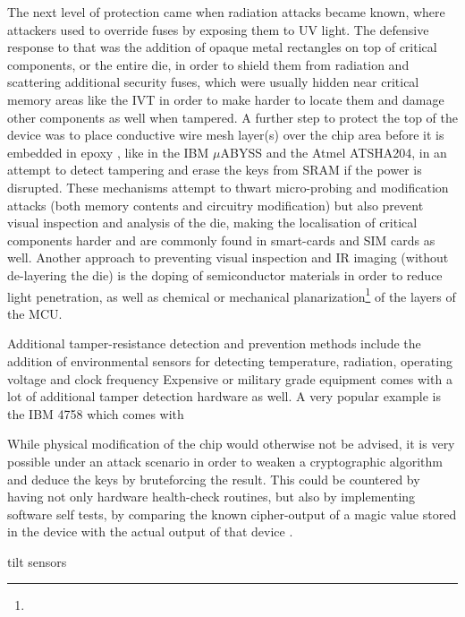 The next level of protection came when radiation attacks became known\citep{sergei:thesis}, where attackers used to override fuses by exposing them to UV light. The defensive response to that was the addition of opaque metal rectangles on top of critical components, or the entire die, in order to shield them from radiation and scattering additional security fuses, which were usually hidden near critical memory areas like the IVT in order to make harder to locate them and damage other components as well when tampered\citep{sergei:thesis}\citep{hwre}. A further step to protect the top of the device was to place conductive wire mesh layer(s) over the chip area before it is embedded in epoxy , like in the IBM $\mu$ABYSS \citep{website:ibm_secure} and the Atmel ATSHA204\citep{hwre}, in an attempt to detect tampering and erase the keys from SRAM if the power is disrupted. These mechanisms attempt to thwart micro-probing and modification attacks (both memory contents and circuitry modification)  but also prevent visual inspection and analysis of the die\citep{hwre}, making the localisation of critical components harder and are commonly found in smart-cards\citep{sergei:thesis} and SIM cards as well\citep{hwre}. Another approach to preventing visual inspection and IR imaging (without de-layering the die) is the doping of semiconductor materials in order to reduce light penetration\citep{sergei:thesis}, as well as chemical or mechanical planarization\footnote{} of the layers of the MCU\citep{sergei:thesis}.

Additional tamper-resistance detection and prevention methods include the addition of environmental sensors for detecting temperature, radiation, operating voltage and clock frequency Expensive or military grade equipment comes with a lot of additional tamper detection hardware as well. A very popular example is the IBM 4758 which comes with 

While physical modification of the chip would otherwise not be advised, it is very possible under an attack scenario in order to weaken a cryptographic algorithm and deduce the keys by bruteforcing the result. This could be countered by having not only hardware health-check routines, but also by implementing software self tests, by comparing the known cipher-output of a magic value stored in the device with the actual output of that device \citep{anderson:tamper_resistance}.

tilt sensors \citep{website:ibm_secure}

